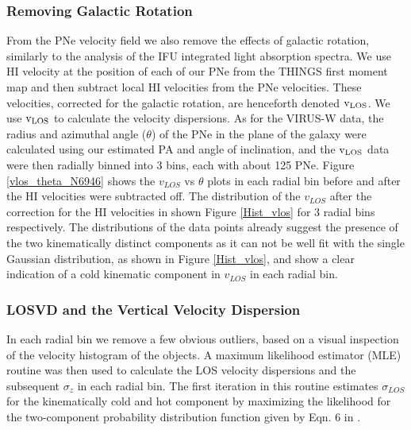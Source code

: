 \documentclass[fleqn,usenatbib]{mnras}
\begin{document}
\subsubsection{Removing Galactic Rotation}
From the PNe velocity field we also remove the effects of galactic rotation, similarly to the analysis of the IFU integrated light absorption spectra.
We use HI velocity at the position of %
each of our PNe from the THINGS first moment map and then subtract local HI velocities from the PNe velocities. 
These velocities, corrected for the galactic rotation, are henceforth denoted $\rm v_{LOS}$. We use $\rm v_{LOS}$ to calculate the velocity dispersions. As for the VIRUS-W data, the radius and azimuthal angle ($\theta$) of the PNe in the plane of the galaxy were calculated using our estimated PA and angle of inclination, and the $\rm v_{LOS}$ data were then radially binned into 3 bins, each with about 125 PNe. Figure \ref{vlos_theta_N6946} shows the $v_{LOS}$ vs $\theta$ plots in each radial bin before and after the HI velocities were subtracted off. The distribution of the $v_{LOS}$ after the correction for the HI velocities in shown Figure \ref{Hist_vlos} for 3 radial bins respectively. The distributions of the data points already suggest the presence of the two kinematically distinct components as it can not be well fit with the single Gaussian distribution, as shown in Figure \ref{Hist_vlos}, and show a clear indication of a cold kinematic component in $v_{LOS}$ in each radial bin.

\subsubsection{LOSVD and the Vertical Velocity Dispersion}  %
In each radial bin we remove a few obvious outliers, based on a visual inspection of the velocity histogram of the objects.  
 A maximum likelihood estimator (MLE) routine was then used to calculate the LOS velocity dispersions and the subsequent $\sigma_z$ in each radial bin. 
The first iteration in this routine estimates $\sigma_{LOS}$ for the kinematically cold and hot component by maximizing the likelihood for the two-component probability distribution function given by Eqn. 6 in .
\end{document}
